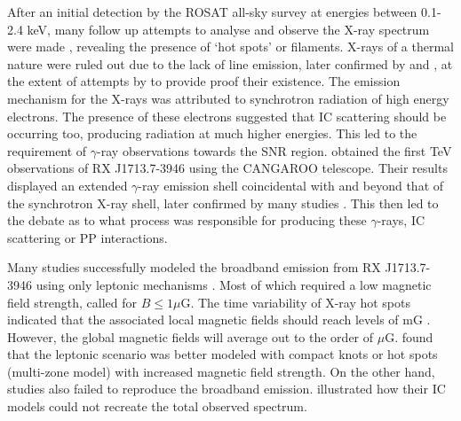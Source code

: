 \documentclass[12pt,a4paper]{article}
\begin{document}
After an initial detection by the ROSAT all-sky survey at energies between 0.1-2.4 keV, many follow up attempts to analyse and observe the X-ray spectrum were made \citep{1997PASJ...49L...7K,2003A&A...400..567U}, revealing the presence of `hot spots' or filaments. 
X-rays of a thermal nature were ruled out due to the lack of line emission, later confirmed by \cite{1999ApJ...525..357S} and \cite{2003A&A...400..567U}, at the extent of attempts by \cite{2005A&A...431..953H} to provide proof their existence. 
The emission mechanism for the X-rays was attributed to synchrotron radiation of high energy electrons. 
The presence of these electrons suggested that IC scattering should be occurring too, producing radiation at much higher energies. 
This led to the requirement of $\gamma$-ray observations towards the SNR region. 
\cite{2000A&A...354L..57M} obtained the first TeV observations of RX J1713.7-3946 using the CANGAROO telescope. 
Their results displayed an extended $\gamma$-ray emission shell coincidental with and beyond that of the synchrotron X-ray shell, later confirmed by many studies \citep{2006A&A...449..223A,2007A&A...464..235A,2008ApJ...685..988T,2009A&A...505..157A,2018A&A...612A...6H}. 
This then led to the debate as to what process was responsible for producing these $\gamma$-rays, IC scattering or PP interactions.

Many studies successfully modeled the broadband emission from RX J1713.7-3946 using only leptonic mechanisms \citep{2001ApJ...563..191E,2004ApJ...602..271L,2011ApJ...735..120Y,2017JHEAp..13...17O}. 
Most of which required a low magnetic field strength, \cite{2004ApJ...602..271L} called for  $B \leq 1 \mu$G.
The time variability of X-ray hot spots indicated that the associated local magnetic fields should reach levels of mG \citep{2007Natur.449..576U}. 
However, the global magnetic fields will average out to the order of $\mu$G.
\cite{2012ApJ...751...65F} found that the leptonic scenario was better modeled with compact knots or hot spots (multi-zone model) with increased magnetic field strength. 
On the other hand, studies also failed to reproduce the broadband emission.  
\cite{2003A&A...400..567U,2006A&A...449..223A,2011ApJ...735..120Y} illustrated how their IC models could not recreate the total observed spectrum. 
\end{document}
